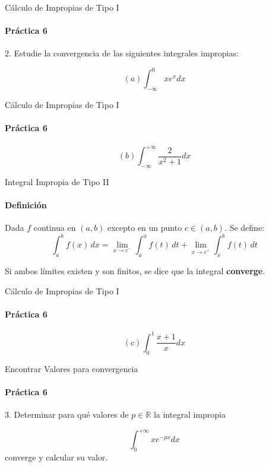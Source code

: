 \documentclass{plantillaPPT}
\begin{document}
\begin{frame}{Cálculo de Impropias de Tipo I}
\framesubtitle{Práctica 6}
2. Estudie la convergencia de las siguientes integrales impropias:

\[(a) \int_{-\infty}^{0} xe^xdx \]

\end{frame}

\begin{frame}{Cálculo de Impropias de Tipo I}
\framesubtitle{Práctica 6}

\[(b) \int_{-\infty}^{+\infty} \frac{2}{x^2+1}dx \]
    
\end{frame}

\begin{frame}{Integral Impropia de Tipo II}
    \framesubtitle{Definición}

\begin{definicion}
Dada \( f \) continua en \( (a, b) \) excepto en un punto \( c \in (a, b) \). Se define:
\vspace{0.3cm}
\[
\int_a^b f(x) \, dx = \lim_{x \to c^-} \int_a^x f(t) \, dt + \lim_{x \to c^+} \int_x^b f(t) \, dt
\]
\vspace{0.3cm}

Si ambos límites existen y son finitos, se dice que la integral \textbf{converge}.
\end{definicion}

\end{frame}

\begin{frame}{Cálculo de Impropias de Tipo I}
\framesubtitle{Práctica 6}

\[(c) \int_{0}^{1} \frac{x+1}{x}dx \]
    
\end{frame}

\begin{frame}{Encontrar Valores para convergencia}
\framesubtitle{Práctica 6}

3. Determinar para qué valores de \(p\in\mathbb{R}\) la integral impropia

\[\int_0^{+\infty}xe^{-px}dx\]
converge y calcular su valor.    
\end{frame}
\end{document}
